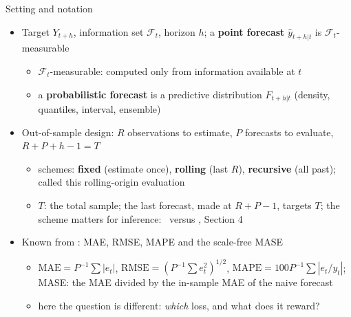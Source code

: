 \begin{frame}{Setting and notation}
\itemsize{\small}
\begin{itemize}
    \item Target $Y_{t+h}$, information set $\mathcal{F}_t$, horizon $h$; a \textbf{point forecast} $\hat y_{t+h|t}$ is $\mathcal{F}_t$-measurable
    \begin{itemize}
        \item $\mathcal{F}_t$-measurable: computed only from information available at $t$
        \item a \textbf{probabilistic forecast} is a predictive distribution $F_{t+h|t}$ (density, quantiles, interval, ensemble)
    \end{itemize}
    \item Out-of-sample design: $R$ observations to estimate, $P$ forecasts to evaluate, $R + P + h - 1 = T$
    \begin{itemize}
        \item schemes: \textbf{fixed} (estimate once), \textbf{rolling} (last $R$), \textbf{recursive} (all past);  called this rolling-origin evaluation
        \item $T$: the total sample; the last forecast, made at $R + P - 1$, targets $T$; the scheme matters for inference: \ versus , Section 4
    \end{itemize}
    \item Known from : MAE, RMSE, MAPE and the scale-free MASE 
    \begin{itemize}
        \item $\mathrm{MAE} = P^{-1}\sum|e_t|$, $\mathrm{RMSE} = (P^{-1}\sum e_t^2)^{1/2}$, $\mathrm{MAPE} = 100P^{-1}\sum|e_t/y_t|$; MASE: the MAE divided by the in-sample MAE of the naive forecast
        \item here the question is different: \emph{which} loss, and what does it reward?
    \end{itemize}
\end{itemize}
\end{frame}

